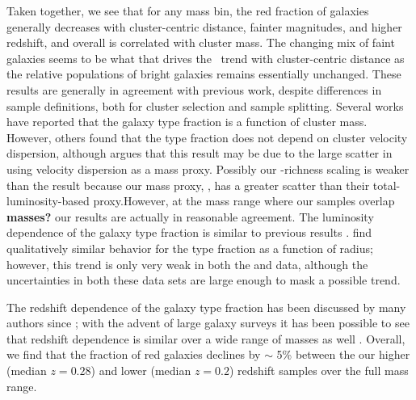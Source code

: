 \documentclass{emulateapj}
\begin{document}
Taken together, we see that for any mass bin, the red fraction of galaxies generally decreases with cluster-centric distance, fainter magnitudes, and higher redshift, and overall is correlated with cluster mass. The changing mix of faint galaxies seems to be what that drives the \fred\ trend with cluster-centric distance as the relative populations of bright galaxies remains essentially unchanged. These results are generally in agreement with previous work, despite differences in sample definitions, both for cluster selection and sample splitting. Several works \citep{Margoniner01,Weinmann06a,Poggianti06,Martinez06,Weinmann06b,Gerke07,Desai07} have reported that the galaxy type fraction is a function of cluster mass. However, others \citep{Balogh04b,depropris04, Tanaka04} found that the type fraction does not depend on cluster velocity dispersion, although \citet{Weinmann06a} argues that this result may be due to the large scatter in using velocity dispersion as a mass proxy. Possibly our \fred-richness scaling is weaker than the \citet{Weinmann06a} result because our mass proxy, \Ntwo, has a greater scatter than their total-luminosity-based proxy.However, at the mass range where our samples overlap {\bf masses?} our results are actually in reasonable agreement. The luminosity dependence of the galaxy type fraction is similar to previous results \citep{depropris04, Wilman05, Weinmann06a, Martinez06, Gerke07}. \citet{depropris04,Weinmann06a} find qualitatively similar behavior for the type fraction as a function of radius; however, this trend is only very weak in both the \citet{Wilman05} and \citet{Gerke07} data, although the uncertainties in both these data sets are large enough to mask a possible trend.

The redshift dependence of the galaxy type fraction has been discussed by many authors since \citet{ButcherOemler}; with the advent of large galaxy surveys it has been possible to see that redshift dependence is similar over a wide range of masses as well \citep{Margoniner01,Wilman05,Martinez06,Gerke07,Desai07}. Overall, we find that the fraction of red galaxies declines by $\sim$ 5\% between the our higher (median $z=0.28$) and lower (median $z=0.2$) redshift samples over the full mass range.



\end{document}
